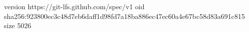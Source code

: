 version https://git-lfs.github.com/spec/v1
oid sha256:923800ec3c48d7eb6daff1d98fd7a18ba886ec47ec60a4e67bc58d83a691c815
size 5026
